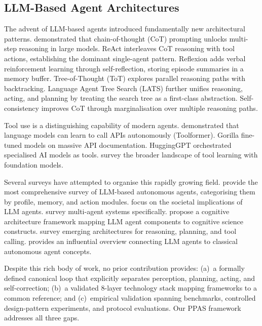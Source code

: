\documentclass[review,authoryear]{elsarticle}
\theoremstyle{definition}
\begin{document}
\subsection{LLM-Based Agent Architectures}

The advent of LLM-based agents introduced fundamentally new architectural patterns. \citet{wei2022chain} demonstrated that chain-of-thought (CoT) prompting unlocks multi-step reasoning in large models. ReAct \citep{yao2023react} interleaves CoT reasoning with tool actions, establishing the dominant single-agent pattern. Reflexion \citep{shinn2023reflexion} adds verbal reinforcement learning through self-reflection, storing episode summaries in a memory buffer. Tree-of-Thought (ToT) \citep{yao2024tree} explores parallel reasoning paths with backtracking. Language Agent Tree Search (LATS) \citep{zhou2024language} further unifies reasoning, acting, and planning by treating the search tree as a first-class abstraction. Self-consistency \citep{wang2023selfconsistency} improves CoT through marginalisation over multiple reasoning paths.

Tool use is a distinguishing capability of modern agents. \citet{schick2024toolformer} demonstrated that language models can learn to call APIs autonomously (Toolformer). Gorilla \citep{patil2023gorilla} fine-tuned models on massive API documentation. HuggingGPT \citep{shen2024hugginggpt} orchestrated specialised AI models as tools. \citet{qin2024toollearning} survey the broader landscape of tool learning with foundation models.

Several surveys have attempted to organise this rapidly growing field. \citet{wang2024survey} provide the most comprehensive survey of LLM-based autonomous agents, categorising them by profile, memory, and action modules. \citet{xi2023rise} focus on the societal implications of LLM agents. \citet{guo2024large} survey multi-agent systems specifically. \citet{sumers2024cognitive} propose a cognitive architecture framework mapping LLM agent components to cognitive science constructs. \citet{masterman2024landscape} survey emerging architectures for reasoning, planning, and tool calling. \citet{weng2023llmagents} provides an influential overview connecting LLM agents to classical autonomous agent concepts.

Despite this rich body of work, no prior contribution provides: (a)~a formally defined canonical loop that explicitly separates perception, planning, acting, and self-correction; (b)~a validated 8-layer technology stack mapping frameworks to a common reference; and (c)~empirical validation spanning benchmarks, controlled design-pattern experiments, and protocol evaluations. Our PPAS framework addresses all three gaps.
\end{document}
